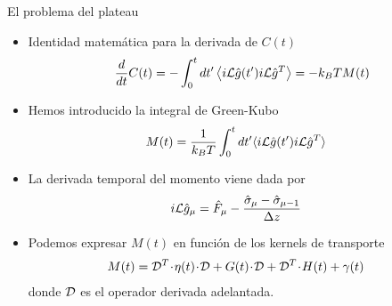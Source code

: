\documentclass{beamer}
\newcommand{\esc}{\!\cdot\!}
\newcommand{\llangle}{\left\langle}
\newcommand{\rrangle}{\right\rangle}
\begin{document}

\begin{frame}{El problema del plateau}
  \begin{itemize}
    \item<1-> Identidad matemática para la derivada de $C(t)$
\begin{align}
  \frac{d}{dt}C(t)
=-  \int_0^t dt' \llangle i{\cal L}\hat{g}(t') i{\cal L}\hat{g}^T\rrangle
=-  k_BT M(t)
\nonumber
\end{align}
\item<2-> Hemos introducido la integral de Green-Kubo 
\begin{align}
M(t)&= \frac{1}{k_BT}\int_0^t dt'\langle i{\cal L}\hat{g}(t')i{\cal L} \hat{g}^T\rangle
\nonumber
\end{align}
\item<3-> La derivada temporal del momento viene dada por
\begin{align}
  i{\cal L}\hat{g}_\mu &=\hat{F}_\mu-\frac{\hat{\sigma}_\mu-\hat{\sigma}_{\mu-1}}{\Delta z}
\nonumber
\end{align}
\item<4-> Podemos expresar $M(t)$ en función de los kernels de transporte 
\begin{align}
  {M}(t)&={\cal D}^T\esc{\eta}(t)\esc {\cal D}+{G}(t)\esc {\cal D}+{\cal D}^T\esc{H}(t)+{\gamma}(t)
\nonumber
\end{align}
donde ${\cal D}$ es el operador derivada adelantada. 
  \end{itemize}
\end{frame}
\end{document}
